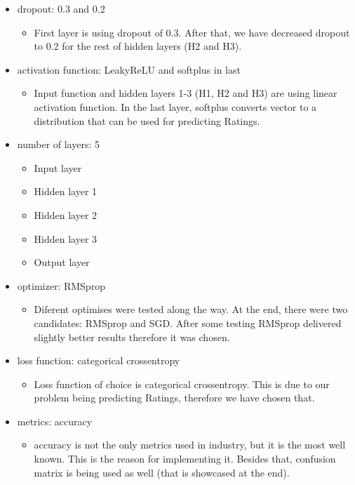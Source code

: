 \begin{itemize}
    \item dropout: 0.3 and 0.2
    \begin{itemize}
        \item First layer is using dropout of 0.3. After that, we have decreased dropout to 0.2 for the rest of hidden layers (H2 and H3).
    \end{itemize}
    
    \item activation function: LeakyReLU and softplus in last
    \begin{itemize}
        \item Input function and  hidden layers 1-3 (H1, H2 and H3) are using linear activation function. In the last layer, softplus converts vector to a distribution that can be used for predicting Ratings.
    \end{itemize}
    
    \item number of layers: 5
    \begin{itemize}
        \item Input layer
        \item Hidden layer 1
        \item Hidden layer 2
        \item Hidden layer 3
        \item Output layer
    \end{itemize}
    
    \item optimizer: RMSprop
    \begin{itemize}
        \item Diferent optimises were tested along the way. At the end, there were two candidates: RMSprop and SGD. After some testing RMSprop delivered slightly better results therefore it was chosen.
    \end{itemize}
    
    \item loss function: categorical crossentropy
    \begin{itemize}
        \item Loss function of choice is categorical crossentropy. This is due to our problem being predicting Ratings, therefore we have chosen that.
    \end{itemize}
    
    \item metrics: accuracy
    \begin{itemize}
        \item accuracy is not the only metrics used in industry, but it is the most well known. This is the reason for implementing it. Besides that, confusion matrix is being used as well (that is showcased at the end).
    \end{itemize}
    
\end{itemize}

